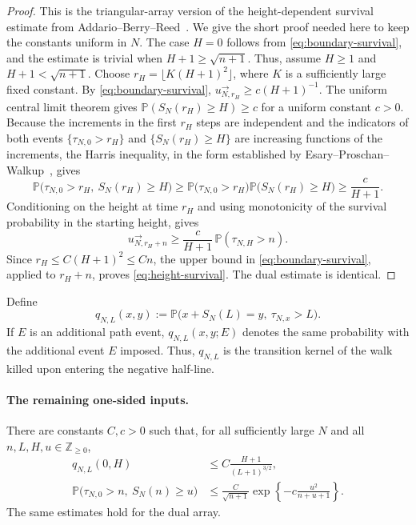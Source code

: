\documentclass[11pt]{article}
\theoremstyle{plain}
\theoremstyle{definition}
\theoremstyle{remark}
\newcommand{\Z}{\mathbb Z}
\newcommand{\Pp}{\mathbb P}
\begin{document}
\begin{proof}
This is the triangular-array version of the height-dependent survival
estimate from Addario--Berry--Reed~\cite[Lemma~3]{ABR}.
We give the short proof needed here to keep the constants uniform in
\(N\). The case \(H=0\) follows from \eqref{eq:boundary-survival}, and the
estimate is trivial when \(H+1\ge\sqrt{n+1}\). Thus, assume \(H\ge1\) and
\(H+1<\sqrt{n+1}\). Choose \(r_H=\lfloor K(H+1)^2\rfloor\), where \(K\)
is a sufficiently large fixed constant. By \eqref{eq:boundary-survival},
\(u_{N,r_H}^{\rightarrow}\ge c(H+1)^{-1}\). The uniform central limit
theorem gives \(\Pp(S_N(r_H)\ge H)\ge c\) for a uniform constant \(c>0\).
Because the increments in the first \(r_H\) steps are independent and the
indicators of both events \(\{\tau_{N,0}>r_H\}\) and
\(\{S_N(r_H)\ge H\}\) are increasing functions of the increments, the
Harris inequality, in the form established by
Esary--Proschan--Walkup~\cite{EPW}, gives
\begin{equation}\label{eq:harrisoutput}
 \Pp\bigl(\tau_{N,0}>r_H,\ S_N(r_H)\ge H\bigr)
 \ge \Pp\bigl(\tau_{N,0}>r_H\bigr)
      \Pp\bigl(S_N(r_H)\ge H\bigr)
 \ge \frac{c}{H+1}.
\end{equation}
Conditioning on the height at time \(r_H\) and using monotonicity of
the survival probability in the starting height, gives
\[
 u_{N,r_H+n}^{\rightarrow}
 \ge
 \frac{c}{H+1}\,\Pp(\tau_{N,H}>n).
\]
Since \(r_H\le C(H+1)^2\le Cn\), the upper bound in
\eqref{eq:boundary-survival}, applied to \(r_H+n\), proves
\eqref{eq:height-survival}. The dual estimate is identical.
\end{proof}

Define
\[
 q_{N,L}(x,y):=
 \Pp\bigl(x+S_N(L)=y,\ \tau_{N,x}>L\bigr).
\]
If \(E\) is an additional path event, \(q_{N,L}(x,y;E)\) denotes the
same probability with the additional event \(E\) imposed. Thus,
\(q_{N,L}\) is the transition kernel of the walk killed upon entering the
negative half-line.

\paragraph{The remaining one-sided inputs.}
There are constants \(C,c>0\) such that, for all sufficiently large
\(N\) and all \(n,L,H,u\in\Z_{\ge0}\),
\begin{align}
 q_{N,L}(0,H)
 &\le C\frac{H+1}{(L+1)^{3/2}},                                  \label{eq:ABR-centered}\\
 \Pp\bigl(\tau_{N,0}>n,\ S_N(n)\ge u\bigr)
 &\le \frac{C}{\sqrt{n+1}}
 \exp\left\{-c\frac{u^2}{n+u+1}\right\}.                        \label{eq:meander-moderate}
\end{align}
The same estimates hold for the dual array.
\end{document}
